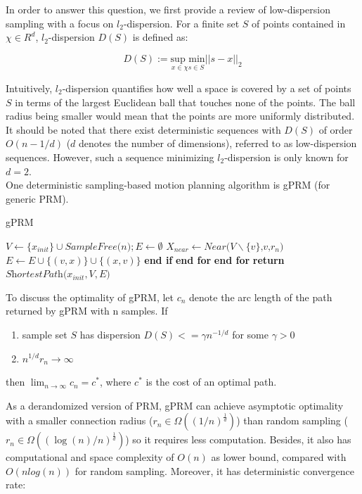 \documentclass[twoside]{article}
\begin{document}
In order to answer this question, we first provide a review of low-dispersion sampling with a focus on $l_2$-dispersion. For a finite set $S$ of points contained in $\chi \in R^d$, $l_2$-dispersion $D(S)$ is defined as:

\begin{equation}
    D(S) := \underset{x\in \chi s \in S}{\text{sup min}} ||s - x||_2
\end{equation}

Intuitively, $l_2$-dispersion quantifies how well a space is covered by a set of points $S$ in terms of the largest Euclidean ball that touches none of the points. The ball radius being smaller would mean that the points are more uniformly distributed. It should be noted that there exist deterministic sequences with $D(S)$ of order $O(n-1/d)$ ($d$ denotes the number of dimensions), referred to as low-dispersion sequences. However, such a sequence minimizing $l_2$-dispersion is only known for $d = 2$.\\

One deterministic sampling-based motion planning algorithm is gPRM (for generic PRM). 

\begin{algorithm}
\caption{gPRM}\label{euclid}
\begin{algorithmic}[1]
\State $\textit{V} \gets \{x_{init}\} \cup \textit{SampleFree(n)}; E \gets \emptyset$
\State $X_{near} \gets  \textit{Near(V$\backslash$\{v\},v,$r_{n}$)}$
  	\State $E \gets E \cup \{(v,x)\} \cup \{(x,v)\}$
  \EndIf
  \State \textbf{end if}
 \EndFor
 \State \textbf{end for}
\EndFor
\State \textbf{end for}
\State \textbf{return} $\textit{ShortestPath($x_{init},V,E$)}$
\end{algorithmic}
\end{algorithm}

To discuss the optimality of gPRM, let $c_n$ denote the arc length of the path returned by gPRM with n samples. If
\begin{enumerate}
\item sample set $S$ has dispersion $D(S)<=\gamma n^{-1/d}$ for some $\gamma > 0$
\item $n^{1/d} r_n \rightarrow \infty$
\end{enumerate}
then $\lim_{n \to \infty} c_n = c^*$, where $c^*$ is the cost of an optimal path.

As a derandomized version of PRM, gPRM can achieve asymptotic optimality with a smaller connection radius ($r_n \in \Omega((1/n)^\frac{1}{d})$) than random sampling ($r_n \in \Omega((\log(n)/n)^\frac{1}{d})$) so it requires less computation. Besides, it also has computational and space complexity of $O(n)$ as lower bound, compared with $O(nlog(n))$ for random sampling. Moreover, it has deterministic convergence rate:
\end{document}
